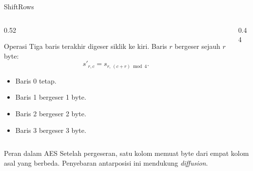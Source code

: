 \documentclass[aspectratio=169,11pt]{beamer}
\begin{document}
\begin{frame}{ShiftRows}
    \footnotesize
    \begin{columns}[T,onlytextwidth]
        \begin{column}{0.52\textwidth}
            \begin{block}{Operasi}
                Tiga baris terakhir digeser siklik ke kiri. Baris $r$
                bergeser sejauh $r$ byte:
                \[
                    s'_{r,c} = s_{r,\,(c+r) \bmod 4}.
                \]
            \end{block}
            \begin{itemize}
                \item Baris 0 tetap.
                \item Baris 1 bergeser 1 byte.
                \item Baris 2 bergeser 2 byte.
                \item Baris 3 bergeser 3 byte.
            \end{itemize}
        \end{column}
        \begin{column}{0.44\textwidth}
            \centering
        \end{column}
    \end{columns}
    \vspace{0.05cm}
    \begin{alertblock}{Peran dalam AES}
        \footnotesize
        Setelah pergeseran, satu kolom memuat byte dari empat kolom asal
        yang berbeda. Penyebaran antarposisi ini mendukung
        \textit{diffusion}.
    \end{alertblock}
\end{frame}
\end{document}
